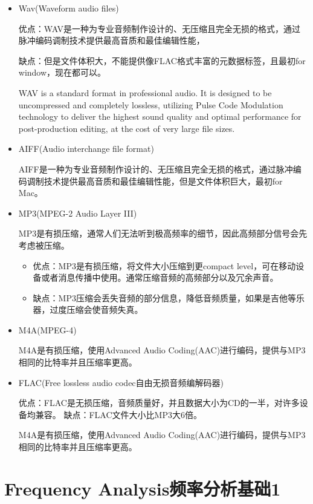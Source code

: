 \documentclass[UTF8]{ctexart}
\begin{document}
\begin{itemize}
    \item Wav(Waveform audio files)
    
    优点：WAV是一种为专业音频制作设计的、无压缩且完全无损的格式，通过脉冲编码调制技术提供最高音质和最佳编辑性能，
    
    缺点：但是文件体积大，不能提供像FLAC格式丰富的元数据标签，且最初for window，现在都可以。

    WAV is a standard format in professional audio. It is designed to be uncompressed and completely lossless, utilizing Pulse Code Modulation technology to deliver the highest sound quality and optimal performance for post-production editing, at the cost of very large file sizes.

    \item AIFF(Audio interchange file format)
    
    AIFF是一种为专业音频制作设计的、无压缩且完全无损的格式，通过脉冲编码调制技术提供最高音质和最佳编辑性能，但是文件体积巨大，最初for Mac。

    \item MP3(MPEG-2 Audio Layer III)
    
    MP3是有损压缩，通常人们无法听到极高频率的细节，因此高频部分信号会先考虑被压缩。

    \begin{itemize}
        \item 优点：MP3是有损压缩，将文件大小压缩到更compact level，可在移动设备或者消息传播中使用。通常压缩音频的高频部分以及冗余声音。
        \item 缺点：MP3压缩会丢失音频的部分信息，降低音频质量，如果是吉他等乐器，过度压缩会使音频失真。
    \end{itemize}

    \item M4A(MPEG-4)
    
    M4A是有损压缩，使用Advanced Audio Coding(AAC)进行编码，提供与MP3相同的比特率并且压缩率更高。

    \item FLAC(Free lossless audio codec自由无损音频编解码器)
    
    优点：FLAC是无损压缩，音频质量好，并且数据大小为CD的一半，对许多设备均兼容。
    缺点：FLAC文件大小比MP3大6倍。

    
    M4A是有损压缩，使用Advanced Audio Coding(AAC)进行编码，提供与MP3相同的比特率并且压缩率更高。
\end{itemize}


\section{Frequency Analysis频率分析基础1}
\end{document}
